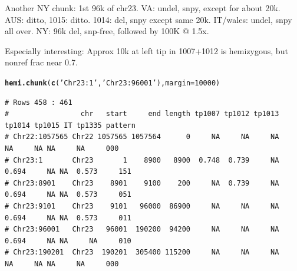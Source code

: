 \documentclass{article}\usepackage[]{graphicx}\usepackage[]{color}
\makeatletter
\newcommand{\hlnum}[1]{\textcolor[rgb]{0.686,0.059,0.569}{#1}}%
\newcommand{\hlstr}[1]{\textcolor[rgb]{0.192,0.494,0.8}{#1}}%
\newcommand{\hlstd}[1]{\textcolor[rgb]{0.345,0.345,0.345}{#1}}%
\newcommand{\hlkwc}[1]{\textcolor[rgb]{0.333,0.667,0.333}{#1}}%
\newcommand{\hlkwd}[1]{\textcolor[rgb]{0.737,0.353,0.396}{\textbf{#1}}}%
\newenvironment{kframe}{%
 \def\at@end@of@kframe{}%
 \ifinner\ifhmode%
  \def\at@end@of@kframe{\end{minipage}}%
  \begin{minipage}{\columnwidth}%
 \fi\fi%
 \def\FrameCommand##1{\hskip\@totalleftmargin \hskip-\fboxsep
 \colorbox{shadecolor}{##1}\hskip-\fboxsep
     \hskip-\linewidth \hskip-\@totalleftmargin \hskip\columnwidth}%
 \MakeFramed {\advance\hsize-\width
   \@totalleftmargin\z@ \linewidth\hsize
   \@setminipage}}%
 {\par\unskip\endMakeFramed%
 \at@end@of@kframe}
\newenvironment{knitrout}{}{} %
\makeatother
\begin{document}
Another NY chunk: 1st 96k of chr23.  VA: undel, snpy, except for about 20k.  AUS: ditto, 1015: ditto.
1014: del, snpy except same 20k.
IT/wales: undel, snpy all over.
NY: 96k del, snp-free, followed by 100K @ 1.5x.

Especially interesting: Approx 10k at left tip in 1007+1012 is hemizygous, but nonref frac near 0.7.

\begin{knitrout}\footnotesize
{}\color{fgcolor}\begin{kframe}
\begin{alltt}
\hlkwd{hemi.chunk}\hlstd{(}\hlkwd{c}\hlstd{(}\hlstr{'Chr23:1'}\hlstd{,}\hlstr{'Chr23:96001'}\hlstd{),}\hlkwc{margin}\hlstd{=}\hlnum{10000}\hlstd{)}
\end{alltt}
\begin{verbatim}
# Rows 458 : 461 
#                 chr   start     end length tp1007 tp1012 tp1013 tp1014 tp1015 IT tp1335 pattern
# Chr22:1057565 Chr22 1057565 1057564      0     NA     NA     NA     NA     NA NA     NA     000
# Chr23:1       Chr23       1    8900   8900  0.748  0.739     NA  0.694     NA NA  0.573     151
# Chr23:8901    Chr23    8901    9100    200     NA  0.739     NA  0.694     NA NA  0.573     051
# Chr23:9101    Chr23    9101   96000  86900     NA     NA     NA  0.694     NA NA  0.573     011
# Chr23:96001   Chr23   96001  190200  94200     NA     NA     NA  0.694     NA NA     NA     010
# Chr23:190201  Chr23  190201  305400 115200     NA     NA     NA     NA     NA NA     NA     000
\end{verbatim}
\end{kframe}


\end{knitrout}
\end{document}
